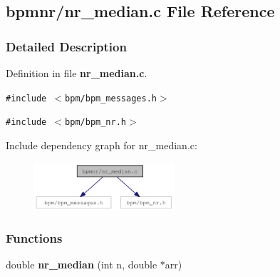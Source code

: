 \subsection{bpmnr/nr\_\-median.c File Reference}
\label{nr__median_8c}


\subsubsection{Detailed Description}


Definition in file {\bf nr\_\-median.c}.

{\tt \#include $<$bpm/bpm\_\-messages.h$>$}\par
{\tt \#include $<$bpm/bpm\_\-nr.h$>$}\par


Include dependency graph for nr\_\-median.c:\nopagebreak
\begin{figure}[H]
\begin{center}
\leavevmode
\includegraphics[width=147pt]{nr__median_8c__incl}
\end{center}
\end{figure}
\subsubsection*{Functions}
\begin{CompactItemize}
\item 
double {\bf nr\_\-median} (int n, double $\ast$arr)
\end{CompactItemize}
